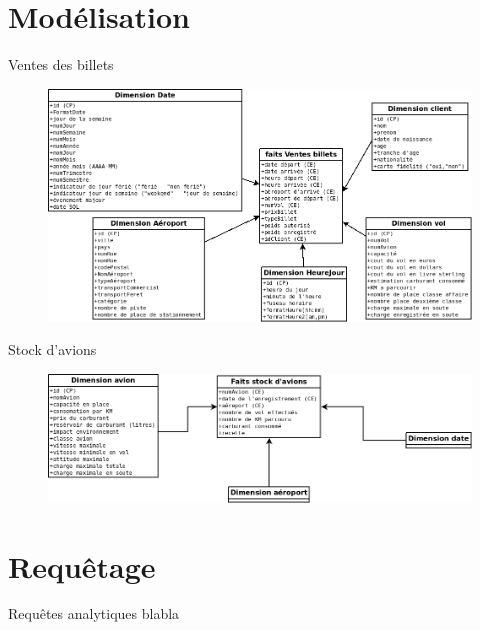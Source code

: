 \documentclass[10pt,handout]{beamer}
\begin{document}

\section{Modélisation}

\begin{frame}{Ventes des billets}
  \begin{figure}
    \includegraphics[width=12cm]{img/VenteBillet.png}
  \end{figure}
\end{frame}

\begin{frame}{Stock d'avions}
  \begin{figure}
    \includegraphics[width=12cm]{img/flotteAvions.png}
  \end{figure}
\end{frame}

\section{Requêtage}
\begin{frame}{Requêtes analytiques}
  blabla
\end{frame}
\end{document}
